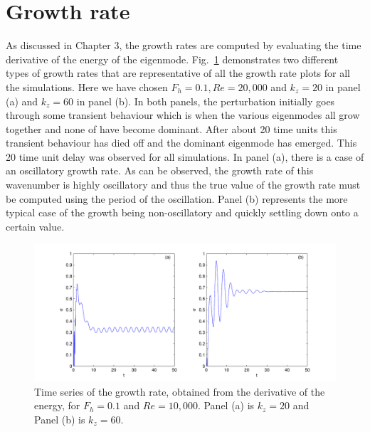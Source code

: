 \section{Growth rate}
As discussed in Chapter 3, the growth rates are computed by evaluating the time derivative of the energy of the eigenmode. Fig.~\ref{sigma_examples} demonstrates two different types of growth rates that are representative of all the growth rate plots for all the simulations. Here we have chosen $F_{h}=0.1, Re=20{,}000$ and $k_{z}=20$ in panel (a) and $k_{z}=60$ in panel (b). In both panels, the perturbation initially goes through some transient behaviour which is when the various eigenmodes all grow together and none of have become dominant. After about 20 time units this transient behaviour has died off and the dominant eigenmode has emerged. This 20 time unit delay was observed for all simulations. In panel (a), there is a case of an oscillatory growth rate. As can be observed, the growth rate of this wavenumber is highly oscillatory and thus the true value of the growth rate must be computed using the period of the oscillation. Panel (b) represents the more typical case of the growth being non-oscillatory and quickly settling down onto a certain value. 
\begin{figure}
\begin{center}
\includegraphics[width=\textwidth]{sigma_examples.pdf}
\caption{Time series of the growth rate, obtained from the derivative of the energy, for $F_{h}=0.1$ and $Re=10{,}000$. Panel (a) is $k_{z}=20$ and Panel (b) is $k_{z}=60$.}
\label{sigma_examples}
\end{center}
\end{figure}

